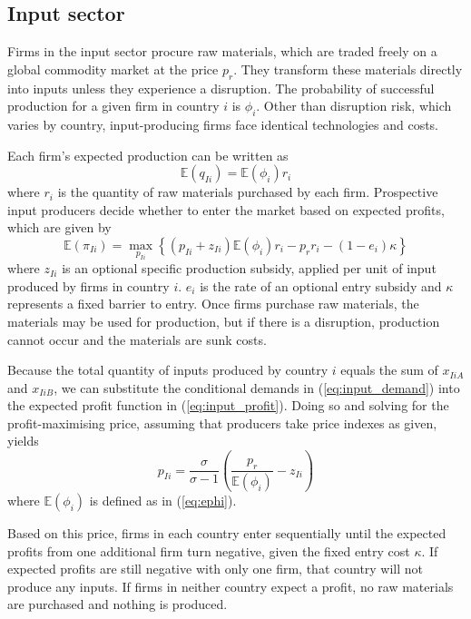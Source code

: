 \documentclass{article}
\begin{document}
\subsection{Input sector}

Firms in the input sector procure raw materials, which are traded freely on a global commodity market at the price $p_r$. They transform these materials directly into inputs unless they experience a disruption. The probability of successful production for a given firm in country $i$ is $\phi_{i}$. Other than disruption risk, which varies by country, input-producing firms face identical technologies and costs.

Each firm's expected production can be written as
\begin{equation}
    \mathbb{E} (q_{Ii}) = \mathbb{E} ( \phi_{i} ) r_i
\end{equation}
where $r_i$ is the quantity of raw materials purchased by each firm. Prospective input producers decide whether to enter the market based on expected profits, which are given by
\begin{equation} \label{eq:input_profit}
    \mathbb{E} (\pi_{Ii}) = \max_{p_{Ii}} \left\{ (p_{Ii} + z_{Ii}) \mathbb{E}(\phi_i) r_{i} - p_r r_i - (1 - e_i) \kappa \right\}
\end{equation}
where $z_{Ii}$ is an optional specific production subsidy, applied per unit of input produced by firms in country $i$. $e_i$ is the rate of an optional entry subsidy and $\kappa$ represents a fixed barrier to entry. Once firms purchase raw materials, the materials may be used for production, but if there is a disruption, production cannot occur and the materials are sunk costs.

Because the total quantity of inputs produced by country $i$ equals the sum of $x_{IiA}$ and $x_{IiB}$, we can substitute the conditional demands in (\ref{eq:input_demand}) into the expected profit function in (\ref{eq:input_profit}). Doing so and solving for the profit-maximising price, assuming that producers take price indexes as given, yields
\begin{equation}
    p_{Ii} = \frac{\sigma}{\sigma - 1} \left( \frac{p_r}{\mathbb{E}(\phi_i)} - z_{Ii} \right)
\end{equation}
where $\mathbb{E}(\phi_i)$ is defined as in (\ref{eq:ephi}).

Based on this price, firms in each country enter sequentially until the expected profits from one additional firm turn negative, given the fixed entry cost $\kappa$. If expected profits are still negative with only one firm, that country will not produce any inputs. If firms in neither country expect a profit, no raw materials are purchased and nothing is produced.
\end{document}
